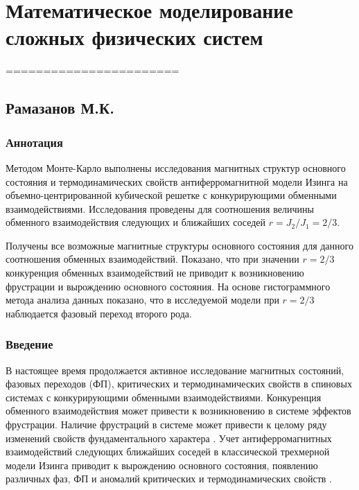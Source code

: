 \chapter{Математическое моделирование сложных физических систем}

=======================





\section{Рамазанов М.К.}



\subsection{Аннотация}

Методом Монте-Карло выполнены исследования магнитных структур основного состояния и термодинамических свойств антиферромагнитной модели Изинга на объемно-центрированной кубической решетке с конкурирующими обменными взаимодействиями. Исследования проведены для соотношения величины обменного взаимодействия следующих и ближайших соседей $r=J_2/J_1=2/3$. 

Получены все возможные магнитные структуры основного состояния для данного соотношения обменных взаимодействий. Показано, что при значении $r=2/3$ конкуренция обменных взаимодействий не приводит к возникновению фрустрации и вырождению основного состояния. На основе гистограммного метода анализа данных показано, что в исследуемой модели при $r=2/3$ наблюдается фазовый переход второго рода. 


\subsection{Введение}

В настоящее время продолжается активное исследование магнитных состояний, фазовых переходов (ФП), критических и термодинамических свойств в спиновых системах с конкурирующими обменными взаимодействиями. Конкуренция обменного взаимодействия может привести к возникновению в системе эффектов фрустрации. Наличие фрустраций в системе может привести к целому ряду изменений свойств фундаментального характера \cite{ph1_1,ph1_2,ph1_3}. Учет антиферромагнитных взаимодействий следующих ближайших соседей в классической трехмерной модели Изинга приводит к вырождению основного состояния, появлению различных фаз, ФП и аномалий критических и термодинамических свойств \cite{ph1_4}.

